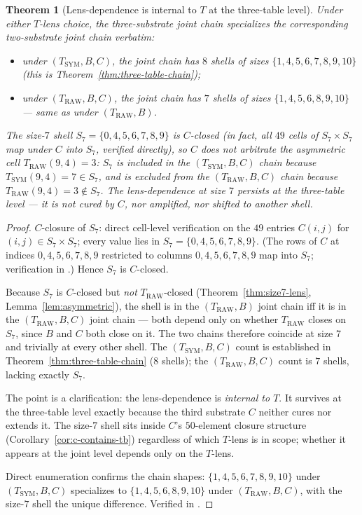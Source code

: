 \documentclass[11pt,reqno]{amsart}
\newtheorem{theorem}{Theorem}[section]
\theoremstyle{definition}
\newcommand{\TRAW}{T_{\mathrm{RAW}}}
\newcommand{\TSYM}{T_{\mathrm{SYM}}}
\begin{document}
\begin{theorem}[Lens-dependence is internal to $T$ at the three-table level]
\label{thm:lens-internal}
Under either $T$-lens choice, the three-substrate joint chain
specializes the corresponding two-substrate joint chain
\emph{verbatim}:
\begin{itemize}[leftmargin=*]
\item under $(\TSYM, B, C)$, the joint chain has $8$ shells of
  sizes $\{1,4,5,6,7,8,9,10\}$ (this is
  Theorem~\ref{thm:three-table-chain});
\item under $(\TRAW, B, C)$, the joint chain has $7$ shells of
  sizes $\{1,4,5,6,8,9,10\}$ — same as under $(\TRAW, B)$.
\end{itemize}
The size-$7$ shell $S_7=\{0,4,5,6,7,8,9\}$ is $C$-closed (in
fact, all $49$ cells of $S_7\times S_7$ map under $C$ into $S_7$,
verified directly), so $C$ does not arbitrate the asymmetric
cell $\TRAW(9,4)=3$: $S_7$ is included in the
$(\TSYM, B, C)$ chain because $\TSYM(9,4)=7\in S_7$, and is
excluded from the $(\TRAW, B, C)$ chain because $\TRAW(9,4)=3
\notin S_7$. The lens-dependence at size $7$ persists at the
three-table level — it is not cured by $C$, nor amplified, nor
shifted to another shell.
\end{theorem}

\begin{proof}
$C$-closure of $S_7$: direct cell-level verification on the
$49$ entries $C(i,j)$ for $(i,j)\in S_7\times S_7$; every value
lies in $S_7=\{0,4,5,6,7,8,9\}$. (The rows of $C$ at indices
$0,4,5,6,7,8,9$ restricted to columns
$0,4,5,6,7,8,9$ map into $S_7$; verification in
\cite{SFM2026}.) Hence $S_7$ is $C$-closed.

Because $S_7$ is $C$-closed but \emph{not} $\TRAW$-closed
(Theorem~\ref{thm:size7-lens}, Lemma~\ref{lem:asymmetric}), the
shell is in the $(\TRAW, B)$ joint chain iff it is in the
$(\TRAW, B, C)$ joint chain — both depend only on whether
$\TRAW$ closes on $S_7$, since $B$ and $C$ both close on it. The
two chains therefore coincide at size $7$ and trivially at every
other shell. The $(\TSYM, B, C)$ count is established in
Theorem~\ref{thm:three-table-chain} ($8$ shells); the
$(\TRAW, B, C)$ count is $7$ shells, lacking exactly $S_7$.

The point is a clarification: the lens-dependence is
\emph{internal to $T$}. It survives at the three-table level
exactly because the third substrate $C$ neither cures nor
extends it. The size-$7$ shell sits inside $C$'s $50$-element
closure structure (Corollary~\ref{cor:c-contains-tb}) regardless
of which $T$-lens is in scope; whether it appears at the joint
level depends only on the $T$-lens.

Direct enumeration confirms the chain shapes:
$\{1,4,5,6,7,8,9,10\}$ under $(\TSYM, B, C)$ specializes to
$\{1,4,5,6,8,9,10\}$ under $(\TRAW, B, C)$, with the size-$7$
shell the unique difference. Verified in \cite{SFM2026}.
\end{proof}
\end{document}
